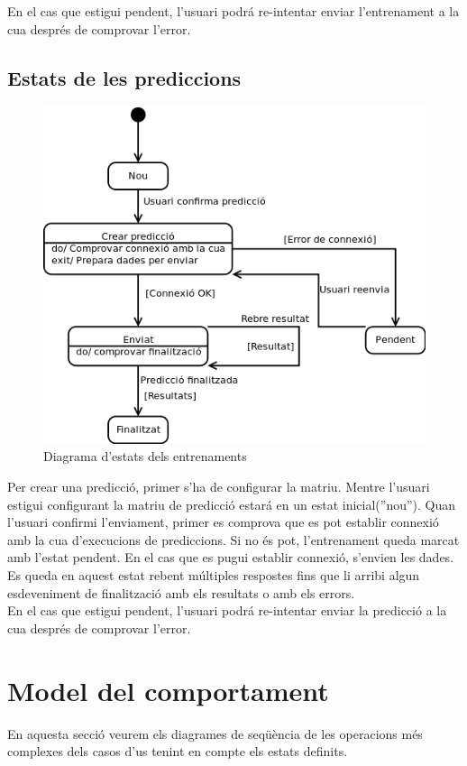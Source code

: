 En el cas que estigui pendent, l'usuari podr\'{a} re-intentar enviar l'entrenament a la cua despr\'{e}s de comprovar l'error.

\subsection{Estats de les prediccions}
\begin{figure}[H]
  \centering
  \includegraphics[scale=0.4]{img/specification/StatesPrediction.png}
  \caption{Diagrama d'estats dels entrenaments}
  \label{fig:statestraining}
\end{figure}
Per crear una predicci\'{o}, primer s'ha de configurar la matriu. Mentre l'usuari estigui configurant la matriu de predicci\'{o} estar\'{a} en un estat inicial(''nou''). Quan l'usuari confirmi l'enviament, primer es comprova que es pot establir connexi\'{o} amb la cua d'execucions de prediccions. Si no \'{e}s pot, l'entrenament queda marcat amb l'estat pendent. En el cas que es pugui establir connexi\'{o}, s'envien les dades. Es queda en aquest estat rebent múltiples respostes fins que li arribi algun esdeveniment de finalitzaci\'{o} amb els resultats o amb els errors.\\

En el cas que estigui pendent, l'usuari podr\'{a} re-intentar enviar la predicci\'{o} a la cua despr\'{e}s de comprovar l'error.

\section{Model del comportament}
En aquesta secci\'{o} veurem els diagrames de seqüència de les operacions m\'{e}s complexes dels casos d'us tenint en compte els estats definits.

